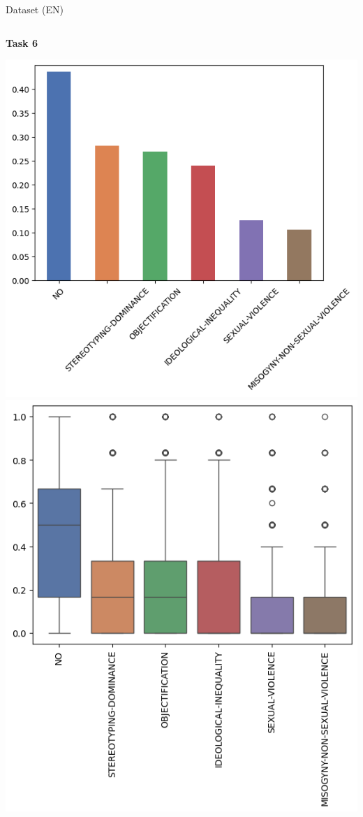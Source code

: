 \begin{frame}{Dataset (EN)}
\begin{columns}[T]
        \begin{column}{0.3\textwidth}
            \centering %
            \textbf{Task 6}

            \includegraphics[height=0.4\textheight, width=\textwidth, keepaspectratio]{images/t6_en_hard_presentacion.png}%
            \vfill
            \includegraphics[height=0.4\textheight, width=\textwidth, keepaspectratio]{images/t6_en_soft_presentacion.png}%
        \end{column}
    \end{columns}
\end{frame}
